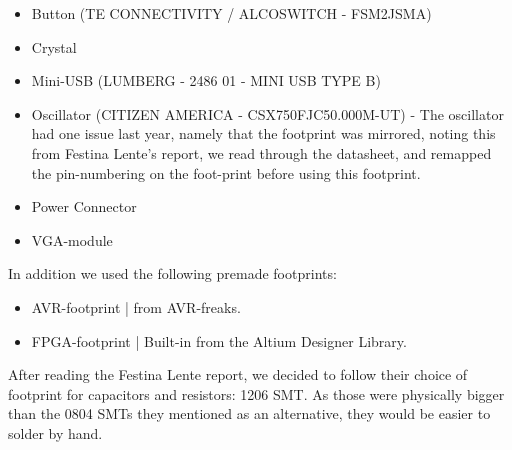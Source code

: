 \begin{itemize}
\item Button (TE CONNECTIVITY / ALCOSWITCH - FSM2JSMA)
\item Crystal
\item Mini-USB (LUMBERG - 2486 01 - MINI USB TYPE B)
\item Oscillator (CITIZEN AMERICA - CSX750FJC50.000M-UT) - 
  The oscillator had one issue last year, namely that the
  footprint was mirrored, noting this from Festina Lente's report, we read
  through the datasheet, and remapped the pin-numbering on the foot-print 
  before using this footprint.
\item Power Connector
\item VGA-module
\end{itemize}

In addition we used the following premade footprints:
\begin{itemize}
\item AVR-footprint | from AVR-freaks.
\item FPGA-footprint | Built-in from the Altium Designer Library.
\end{itemize}

After reading the Festina Lente report\cite{berg2011festinalente}, we decided to
follow their choice of footprint for capacitors and resistors: 1206 SMT. As
those were physically bigger than the 0804 SMTs they mentioned as an
alternative, they would be easier to solder by hand.
